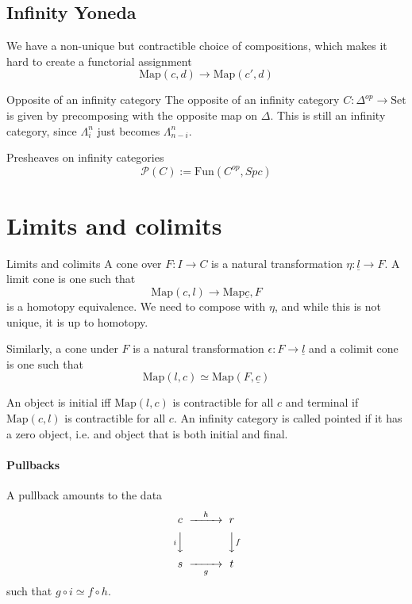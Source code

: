 \subsection{Infinity Yoneda}

We have a non-unique but contractible choice of compositions, which makes it hard to create a functorial assignment $$\mathrm{Map}(c,d)\rightarrow \mathrm{Map}(c',d)$$

\begin{definition}{Opposite of an infinity category}{}
    The opposite of an infinity category $C:\Delta^{op}\rightarrow \mathrm{Set}$ is given by precomposing with the opposite map on $\Delta$. This is still an infinity category, since $\Lambda^n_i$ just becomes $\Lambda^n_{n-i}$.  
\end{definition}


Presheaves on infinity categories
$$\mathcal{P}(C):=\mathrm{Fun}(C^{op}, Spc)$$

\section{Limits and colimits}

\begin{definition}{Limits and colimits}{}
    A cone over $F:I\rightarrow C$ is a natural transformation $\eta:\underline{l}\rightarrow F$. A limit cone is one such that $$\mathrm{Map}(c,l)\rightarrow \mathrm{Map}{\underline{c},F}$$ is a homotopy equivalence. We need to compose with $\eta$, and while this is not unique, it is up to homotopy.

    Similarly, a cone under $F$ is a natural transformation $\epsilon:F\rightarrow \underline{l}$ and a colimit cone is one such that $$\mathrm{Map}(l,c)\simeq \mathrm{Map}(F,\underline{c})$$
    
\end{definition}

An object is initial iff $\mathrm{Map}(l,c)$ is contractible for all $c$ and terminal if $\mathrm{Map}(c,l)$ is contractible for all $c$. An infinity category is called pointed if it has a zero object, i.e. and object that is both initial and final.

\paragraph*{Pullbacks}

A pullback amounts to the data $$\begin{CD}
    c @> h> > r \\
    @ViVV @VVfV \\
    s @> > g> t
\end{CD}$$
such that $g\circ i \simeq f\circ h$.


